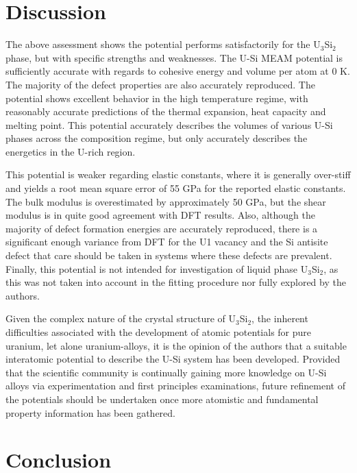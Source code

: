 \documentclass[review]{elsarticle}
\begin{document}
\FloatBarrier
\clearpage

\section{Discussion}

The above assessment shows the potential performs satisfactorily for the U$_{3}$Si$_{2}$ phase, but with specific strengths and weaknesses.  The U-Si MEAM potential is sufficiently accurate with regards to cohesive energy and volume per atom at 0 K.  The majority of the defect properties are also accurately reproduced.  The potential shows excellent behavior in the high temperature regime, with reasonably accurate predictions of the thermal expansion, heat capacity and melting point.  This potential accurately describes the volumes of various U-Si phases across the composition regime, but only accurately describes the energetics in the U-rich region.  

This potential is weaker regarding elastic constants, where it is generally over-stiff and yields a root mean square error of 55 GPa for the reported elastic constants.  The bulk modulus is overestimated by approximately 50 GPa, but the shear modulus is in quite good agreement with DFT results.  Also, although the majority of defect formation energies are accurately reproduced, there is a significant enough variance from DFT for the U1 vacancy and the Si antisite defect that care should be taken in systems where these defects are prevalent.  Finally, this potential is not intended for investigation of liquid phase U$_{3}$Si$_{2}$, as this was not taken into account in the fitting procedure nor fully explored by the authors.  

Given the complex nature of the crystal structure of U$_{3}$Si$_{2}$, the inherent difficulties associated with the development of atomic potentials for pure uranium, let alone uranium-alloys, it is the opinion of the authors that a suitable interatomic potential to describe the U-Si system has been developed.  Provided that the scientific community is continually gaining more knowledge on U-Si alloys via experimentation and first principles examinations, future refinement of the potentials should be undertaken once more atomistic and fundamental property information has been gathered.  

\section{Conclusion}
\end{document}
